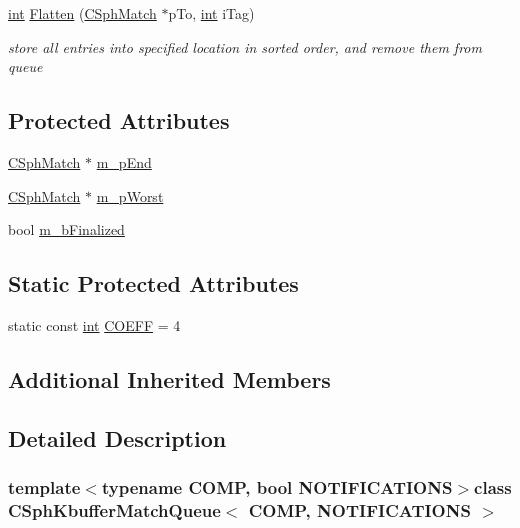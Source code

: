 \begin{DoxyCompactItemize}
\hyperlink{sphinxexpr_8cpp_a4a26e8f9cb8b736e0c4cbf4d16de985e}{int} \hyperlink{classCSphKbufferMatchQueue_a7779ac6132d25119bb50718f5a2cebd2}{Flatten} (\hyperlink{classCSphMatch}{C\-Sph\-Match} $\ast$p\-To, \hyperlink{sphinxexpr_8cpp_a4a26e8f9cb8b736e0c4cbf4d16de985e}{int} i\-Tag)
\begin{DoxyCompactList}\small\item\em store all entries into specified location in sorted order, and remove them from queue \end{DoxyCompactList}\end{DoxyCompactItemize}
\subsection*{Protected Attributes}
\begin{DoxyCompactItemize}
\item 
\hyperlink{classCSphMatch}{C\-Sph\-Match} $\ast$ \hyperlink{classCSphKbufferMatchQueue_a6f72185e0462dabeb2d6c608149e374d}{m\-\_\-p\-End}
\item 
\hyperlink{classCSphMatch}{C\-Sph\-Match} $\ast$ \hyperlink{classCSphKbufferMatchQueue_a68c72dc2e73d0e7925cc26b14072513c}{m\-\_\-p\-Worst}
\item 
bool \hyperlink{classCSphKbufferMatchQueue_aa0449599deac04791508a3e12a4af20b}{m\-\_\-b\-Finalized}
\end{DoxyCompactItemize}
\subsection*{Static Protected Attributes}
\begin{DoxyCompactItemize}
\item 
static const \hyperlink{sphinxexpr_8cpp_a4a26e8f9cb8b736e0c4cbf4d16de985e}{int} \hyperlink{classCSphKbufferMatchQueue_a56d11f79a272bbce8419a3bcff551301}{C\-O\-E\-F\-F} = 4
\end{DoxyCompactItemize}
\subsection*{Additional Inherited Members}


\subsection{Detailed Description}
\subsubsection*{template$<$typename C\-O\-M\-P, bool N\-O\-T\-I\-F\-I\-C\-A\-T\-I\-O\-N\-S$>$class C\-Sph\-Kbuffer\-Match\-Queue$<$ C\-O\-M\-P, N\-O\-T\-I\-F\-I\-C\-A\-T\-I\-O\-N\-S $>$}

